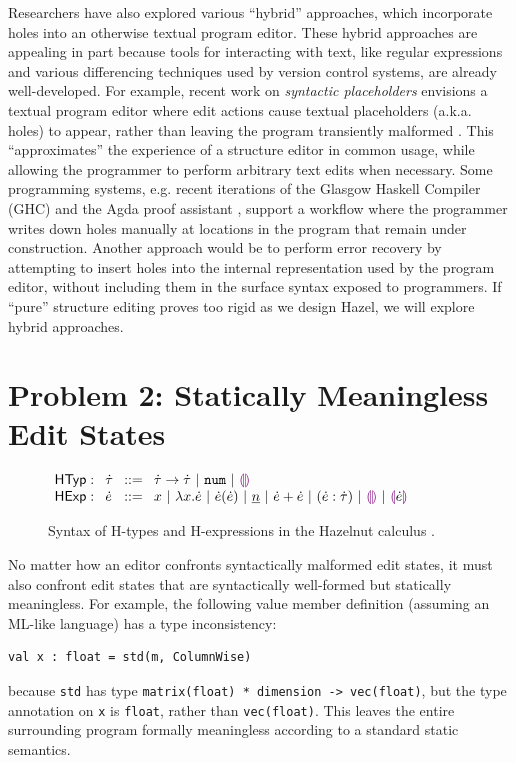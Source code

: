 \documentclass[letterpaper,USenglish]{lipics-v2016}
\let\li\lstinline
\newcommand{\Hazel}[0]{\textsf{Hazel}}
\newcommand{\llparenthesiscolor}{\textcolor{violet}{\llparenthesis}}
\newcommand{\rrparenthesiscolor}{\textcolor{violet}{\rrparenthesis}}
\newcommand{\htau}{\dot{\tau}}
\newcommand{\tarr}[2]{#1 \rightarrow #2}
\newcommand{\tnum}{\texttt{num}}
\newcommand{\tehole}{\llparenthesiscolor\rrparenthesiscolor}
\newcommand{\hexp}{\dot{e}}
\newcommand{\hlam}[2]{\lambda #1.#2}
\newcommand{\hap}[2]{#1(#2)}
\newcommand{\hnum}[1]{\underline{#1}}
\newcommand{\hadd}[2]{#1 + #2}
\newcommand{\hehole}{\llparenthesiscolor\rrparenthesiscolor}
\newcommand{\hhole}[1]{\llparenthesiscolor#1\rrparenthesiscolor}
\begin{document}
Researchers have also explored various ``hybrid'' approaches, which incorporate holes into an otherwise textual program editor. These hybrid approaches are appealing in part because tools for interacting with text, like regular expressions and various differencing techniques used by version control systems, are already well-developed. For example, recent work on \emph{syntactic placeholders} envisions 
a textual program editor where edit actions cause textual placeholders (a.k.a. holes) to appear, rather than leaving the program transiently malformed \cite{Amorim:2016:PSC:2997364.2997374}. This 
``approximates'' the experience of a structure editor in common usage, while allowing the programmer to perform arbitrary 
text edits when necessary. Some programming systems, e.g. recent iterations of the Glasgow Haskell Compiler (GHC) \cite{GCHWIKI} and the Agda proof assistant \cite{norell2009dependently}, support a workflow where the programmer writes down holes manually at locations in the program that remain under construction. Another approach would be to perform error recovery by attempting to insert holes into the internal representation used 
by the program editor, without including them in the surface syntax exposed to programmers.  If ``pure'' structure editing proves too rigid as we design \Hazel, we will explore hybrid approaches.

\section{Problem 2: Statically Meaningless Edit States} \label{sec:p-statics}

\begin{figure}[t]
$\arraycolsep=4pt\begin{array}{lllllll}
\mathsf{HTyp:} & \htau & ::= &
  \tarr{\htau}{\htau} ~\vert~
  \tnum ~\vert~
  \tehole
\\
\mathsf{HExp:} & \hexp & ::= &
  x ~\vert~
  \hlam{x}{\hexp} ~\vert~
  \hap{\hexp}{\hexp} ~\vert~
  \hnum{n} ~\vert~
  \hadd{\hexp}{\hexp} ~\vert~
  (\hexp : \htau) ~\vert~
  \hehole ~\vert~
  \hhole{\hexp}
\end{array}$
\caption{Syntax of H-types and H-expressions in the Hazelnut calculus \cite{popl-paper}.}
\label{fig:hexp-syntax}
\end{figure}

No matter how an 
editor confronts syntactically malformed edit states, it must also confront 
edit states that are syntactically well-formed but statically meaningless. For
example, the following value member definition (assuming an ML-like language) has a type inconsistency:
\begin{lstlisting}[numbers=none]
val x : float = std(m, ColumnWise)
\end{lstlisting}
because \li{std} has type \li{matrix(float) * dimension -> vec(float)},
but the type annotation on \li{x} is \li{float}, rather than \li{vec(float)}. This leaves the entire surrounding program
formally meaningless according to a standard static semantics.
\end{document}
